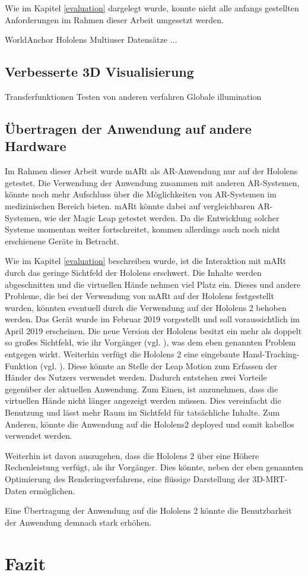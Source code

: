 Wie im Kapitel \ref{evaluation} dargelegt wurde, konnte nicht alle anfangs gestellten Anforderungen im Rahmen dieser Arbeit umgesetzt werden. 

WorldAnchor Hololens
Multiuser
Datensätze
...

\subsection{Verbesserte 3D Visualisierung}
Transferfunktionen
Testen von anderen verfahren
Globale illumination

\subsection{Übertragen der Anwendung auf andere Hardware}
\label{hololens2Fazit}

Im Rahmen dieser Arbeit wurde mARt als AR-Anwendung nur auf der Hololens getestet. 
Die Verwendung der Anwendung zusammen mit anderen AR-Systemen, könnte noch mehr Aufschluss über die Möglichkeiten von AR-Systemen im medizinischen Bereich bieten. 
mARt könnte dabei auf vergleichbaren AR-Systemen, wie der Magic Leap getestet werden.
Da die Entwicklung solcher Systeme momentan weiter fortschreitet, kommen allerdings auch noch nicht erschienene Geräte in Betracht.

Wie im Kapitel \ref{evaluation} beschreiben wurde, ist die Interaktion mit mARt durch das geringe Sichtfeld der Hololens erschwert. Die Inhalte werden abgeschnitten und die virtuellen Hände nehmen viel Platz ein. 
Dieses und andere Probleme, die bei der Verwendung von mARt auf der Hololens festgestellt wurden, könnten eventuell durch die Verwendung auf der Hololens 2 behoben werden. 
Das Gerät wurde im Februar 2019 vorgestellt und soll voraussichtlich im April 2019 erscheinen. 
Die neue Version der Hololens besitzt ein mehr als doppelt so großes Sichtfeld, wie ihr Vorgänger (vgl. \citet{hololens2}), was dem eben genannten Problem entgegen wirkt. 
Weiterhin verfügt die Hololens 2 eine eingebaute Hand-Tracking-Funktion (vgl. \citet{hololens2}). Diese könnte an Stelle der Leap Motion zum Erfassen der Händer des Nutzers verwendet werden. Dadurch entstehen zwei Vorteile gegenüber der aktuellen Anwendung. Zum Einen, ist anzunehmen, dass die virtuellen Hände nicht länger angezeigt werden müssen. Dies vereinfacht die Benutzung und lässt mehr Raum im Sichtfeld für tatsächliche Inhalte. Zum Anderen, könnte die Anwendung auf die Hololens2 deployed und somit kabellos verwendet werden. 

Weiterhin ist davon auszugehen, dass die Hololens 2 über eine Höhere Rechenleistung verfügt, als ihr Vorgänger. Dies könnte, neben der eben genannten Optimierung des Renderingverfahrens, eine flüssige Darstellung der 3D-MRT-Daten ermöglichen.

Eine Übertragung der Anwendung auf die Hololens 2 könnte die Benutzbarkeit der Anwendung demnach stark erhöhen.


\section{Fazit}
